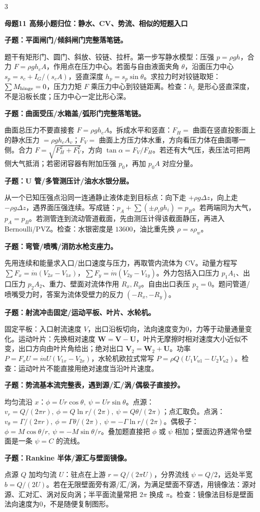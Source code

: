 \documentclass[a4paper]{article}
\newcommand{\mt}[1]{\vspace{0.45pt}\colorbox{M}{\parbox{\dimexpr\linewidth-2\fboxsep}{\color{white}\bfseries #1}}\par}
\newcommand{\qt}[1]{\vspace{0.25pt}\colorbox{Q}{\parbox{\dimexpr\linewidth-2\fboxsep}{\color{white}\bfseries #1}}\par}
\newcommand{\ans}[1]{\colorbox{G}{\parbox{\dimexpr\linewidth-2\fboxsep}{#1}}\par}
\begin{document}
\begin{multicols}{3}
\mt{母题11 高频小题归位：静水、CV、势流、相似的短题入口}
\qt{子题：平面闸门/倾斜闸门完整落笔链。}
\ans{题干有矩形门、圆门、斜放、铰链、拉杆。第一步写静水模型：压强 $p=\rho gh$，合力 $F=\rho gh_cA$，作用点在压力中心。若面与自由液面夹角 $\theta$，沿面压力中心 $s_p=s_c+I_G/(s_cA)$，竖直深度 $h_p=s_p\sin\theta$。求拉力时对铰链取矩：$\sum M_{\rm hinge}=0$，压力力矩 $F$ 乘压力中心到铰链距离。检查：$h_c$ 是形心竖直深度，不是沿板长度；压力中心一定比形心深。}
\qt{子题：曲面受压/水箱盖/弧形门完整落笔链。}
\ans{曲面总压力不要直接套 $F=\rho gh_cA$。拆成水平和竖直：$F_H=$ 曲面在竖直投影面上的静水压力 $=\rho gh_cA_v$；$F_V=$ 曲面上方压力体水重，方向看压力体在曲面哪一侧。合力 $F=\sqrt{F_H^2+F_V^2}$，方向 $\tan\alpha=F_V/F_H$。若还有大气压，表压法可把两侧大气抵消；若密闭容器有附加压强 $p_0$，再加 $p_0A$ 对应分量。}
\qt{子题：U 管/多管测压计/油水水银分层。}
\ans{从一个已知压强点沿同一连通静止液体走到目标点：向下走 $+\rho g\Delta z$，向上走 $-\rho g\Delta z$，遇界面压强连续。写成链：$p_A+\sum(\pm\rho_i g h_i)=p_B$。若两端同为大气，$p_A=p_B$。若测管连到流动管道截面，先由测压计得该截面静压，再进入 Bernoulli/PVZ。检查：水银密度是 $13600$，油比重先换 $\rho=s\rho_w$。}
\qt{子题：弯管/喷嘴/消防水枪支座力。}
\ans{先用连续和能量求入口/出口速度与压力，再取管内流体为 CV。动量方程写 $\sum F_x=\dot m(V_{2x}-V_{1x})$，$\sum F_y=\dot m(V_{2y}-V_{1y})$。外力包括入口压力 $p_1A_1$、出口压力 $p_2A_2$、重力、壁面对流体作用 $R_x,R_y$。自由出口表压 $p_2=0$。题问管道/喷嘴受力时，答案为流体受壁力的反力 $(-R_x,-R_y)$。}
\qt{子题：射流冲击固定/运动平板、叶片、水轮机。}
\ans{固定平板：入口射流速度 $V$，出口沿板切向，法向速度变为0，力等于动量通量变化。运动叶片：先换相对速度 $\bm W=\bm V-\bm U$，叶片无摩擦时相对速度大小近似不变，出口方向由叶片角给出；绝对出口 $\bm V_2=\bm W_2+\bm U$。功率 $P=F_xU=\dot m U(V_{1x}-V_{2x})$，水轮机欧拉式常写 $P=\rho Q(U_1V_{u1}-U_2V_{u2})$。检查：运动叶片不能直接用绝对速度当沿叶片速度。}
\qt{子题：势流基本流完整表，遇到源/汇/涡/偶极子直接抄。}
\ans{均匀流沿 $x$：$\phi=Ur\cos\theta,\ \psi=Ur\sin\theta$。点源：$v_r=Q/(2\pi r),\ \phi=Q\ln r/(2\pi),\ \psi=Q\theta/(2\pi)$；点汇取负。点涡：$v_\theta=\Gamma/(2\pi r),\ \phi=\Gamma\theta/(2\pi),\ \psi=-\Gamma\ln r/(2\pi)$。偶极子：$\phi=M\cos\theta/r,\ \psi=-M\sin\theta/r$。叠加题直接把 $\phi$ 或 $\psi$ 相加；壁面边界通常令壁面是一条 $\psi=C$ 的流线。}
\qt{子题：Rankine 半体/源汇与壁面镜像。}
\ans{点源 $Q$ 加均匀流 $U$：驻点在上游 $r=Q/(2\pi U)$，分界流线 $\psi=Q/2$，远处半宽 $b=Q/(2U)$。若在无限壁面旁有源/汇/涡，为满足壁面不穿透，用镜像法：源对源、汇对汇、涡对反向涡；半平面流量常把 $2\pi$ 换成 $\pi$。检查：镜像法目标是壁面法向速度为0，不是随便复制图形。}

\end{multicols}
\end{document}
